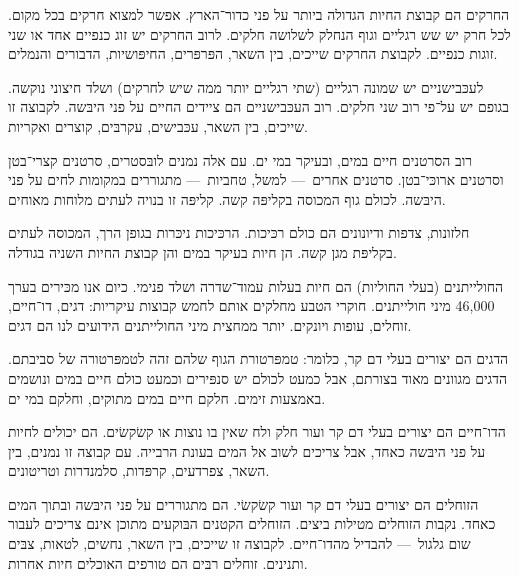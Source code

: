 
החרקים הם קבוצת החיות הגדולה ביותר על פני כדור־הארץ. אפשר למצוא חרקים בכל מקום. לכל חרק יש שש רגליים וגוף הנחלק לשלושה חלקים. לרוב החרקים יש זוג כנפיים אחד או שני זוגות כנפיים. לקבוצת החרקים שייכים, בין השאר, הפּרפּרים, החיפּושיות, הדבורים והנמלים.



לעכּבישניים יש שמונה רגליים (שתי רגליים יותר ממה שיש לחרקים) ושלד חיצוני נוקשה. בגופם יש על־פי רוב שני חלקים. רוב העכּבישניים הם ציידים החיים על פני היבּשה. לקבוצה זו שייכים, בין השאר, עכּבישים, עקרבּים, קוצרים ואקריות.



רוב הסרטנים חיים במים, ובעיקר במי ים. עם אלה נמנים לובּסטרים, סרטנים קצרי־בטן וסרטנים ארוכּי־בטן. סרטנים אחרים~— למשל, טחביות~— מתגוררים במקומות לחים על פני היבּשה. לכולם גוף המכוסה בקליפּה קשה. קליפּה זו בנויה לעתים מלוחות מאוחים.



חלזונות, צדפות ודיונונים הם כולם רכּיכות. הרכּיכות ניכּרות בגופן הרך, המכוסה לעתים בקליפּת מגן קשה. הן חיות בעיקר במים והן קבוצת החיות השניה בגודלה.



החולייתנים (בעלי החוליות) הם חיות בעלות עמוד־שדרה ושלד פנימי. כיום אנו מכּירים בערך 46,000 מיני חולייתנים. חוקרי הטבע מחלקים אותם לחמש קבוצות עיקריות: דגים, דו־חיים, זוחלים, עופות ויונקים. יותר ממחצית מיני החולייתנים הידועים לנו הם דגים.



הדגים הם יצורים בעלי דם קר, כלומר: טמפּרטורת הגוף שלהם זהה לטמפּרטורה של סביבתם. הדגים מגוונים מאוד בצורתם, אבל כמעט לכולם יש סנפּירים וכמעט כולם חיים במים ונושמים באמצעות זימים. חלקם חיים במים מתוקים, וחלקם במי ים.



הדו־חיים הם יצורים בעלי דם קר ועור חלק ולח שאין בו נוצות או קשׂקשׂים. הם יכולים לחיות על פני היבּשה  כאחד, אבל צריכים לשוב אל המים בעונת הרבייה. עם קבוצה זו נמנים, בין השאר, צפרדעים, קרפּדות, סלמנדרות וטריטונים.



הזוחלים הם יצורים בעלי דם קר ועור קשׂקשׂי. הם מתגוררים על פני היבּשה ובתוך המים כאחד. נקבות הזוחלים מטילות ביצים. הזוחלים הקטנים הבּוקעים מתוכן אינם צריכים לעבור שום גלגול~— להבדיל מהדו־חיים. לקבוצה זו שייכים, בין השאר, נחשים, לטאות, צבּים ותנינים. זוחלים רבּים הם טורפים האוכלים חיות אחרות.


